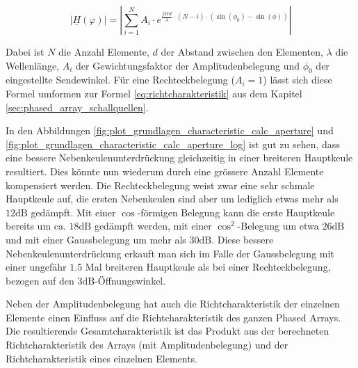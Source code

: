 \begin{equation}
\left | \underline{H}(\varphi) \right | = \left | \sum\limits_{i = 1}^{N}{A_{i} \cdot e^{\frac{j 2 \pi d}{\lambda} \cdot (N - i) \cdot (\sin{(\phi_{0})} - \sin{(\phi)})}} \right |
\label{eq:amplitudenbelegung}
\end{equation}

Dabei ist $N$ die Anzahl Elemente, $d$ der Abstand zwischen den Elementen, $\lambda$ die Wellenlänge, $A_{i}$ der Gewichtungsfaktor der Amplitudenbelegung und $\phi_{0}$ der eingestellte Sendewinkel. Für eine Rechteckbelegung ($A_{i} = 1$) lässt sich diese Formel umformen zur Formel \ref{eq:richtcharakteristik} aus dem Kapitel \ref{sec:phased_array_schallquellen}.

In den Abbildungen \ref{fig:plot_grundlagen_characteristic_calc_aperture} und \ref{fig:plot_grundlagen_characteristic_calc_aperture_log} ist gut zu sehen, dass eine bessere Nebenkeulenunterdrückung gleichzeitig in einer breiteren Hauptkeule resultiert. Dies könnte nun wiederum durch eine grössere Anzahl Elemente kompensiert werden. Die Rechteckbelegung weist zwar eine sehr schmale Hauptkeule auf, die ersten Nebenkeulen sind aber um lediglich etwas mehr als $12 \mathrm{dB}$ gedämpft. Mit einer $\cos$-förmigen Belegung kann die erste Hauptkeule bereits um ca. $18 \mathrm{dB}$ gedämpft werden, mit einer $\cos^{2}$-Belegung um etwa $26 \mathrm{dB}$ und mit einer Gaussbelegung um mehr als $30 \mathrm{dB}$. Diese bessere Nebenkeulenunterdrückung erkauft man sich im Falle der Gaussbelegung mit einer ungefähr $1.5$ Mal breiteren Hauptkeule als bei einer Rechteckbelegung, bezogen auf den $3 \mathrm{dB}$-Öffnungswinkel.

Neben der Amplitudenbelegung hat auch die Richtcharakteristik der einzelnen Elemente einen Einfluss auf die Richtcharakteristik des ganzen Phased Arrays. Die resultierende Gesamtcharakteristik ist das Produkt aus der berechneten Richtcharakteristik des Arrays (mit Amplitudenbelegung) und der Richtcharakteristik eines einzelnen Elements.

\clearpage

